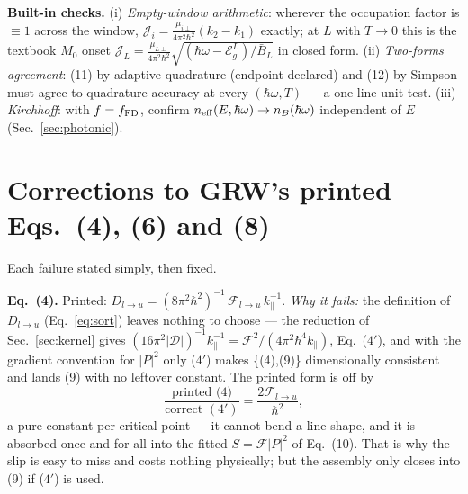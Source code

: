 \documentclass[11pt,a4paper]{article}
\numberwithin{equation}{section}
\newcommand{\hw}{\hbar\omega}
\newcommand{\EgL}{\mathcal{E}_g^{L}}
\newcommand{\cD}{\mathcal{D}}
\newcommand{\cF}{\mathcal{F}}
\newcommand{\cJ}{\mathcal{J}}
\newcommand{\Bb}{\bar{B}}
\newcommand{\kpar}{k_{\parallel}}
\newcommand{\Dlu}{D_{l\to u}}
\newcommand{\fFD}{f}
\begin{document}
\textbf{Built-in checks.}
(i) \emph{Empty-window arithmetic}: wherever the occupation factor is
$\equiv1$ across the window,
$\cJ_i=\frac{\mu_{i\perp}}{4\pi^2\hbar^2}(k_2-k_1)$ exactly; at $L$
with $T\to0$ this is the textbook $M_0$ onset
$\cJ_L=\frac{\mu_{L\perp}}{4\pi^2\hbar^2}
\sqrt{(\hw-\EgL)/\Bb_L}$ in closed form.
(ii) \emph{Two-forms agreement}: (11) by adaptive quadrature (endpoint
declared) and (12) by Simpson must agree to quadrature accuracy at
every $(\hw,T)$ --- a one-line unit test.
(iii) \emph{Kirchhoff}: with $\fFD=\fFD_{\rm FD}$, confirm
$n_{\rm eff}(E,\hw)\to n_B(\hw)$ independent of $E$
(Sec.~\ref{sec:photonic}).

\appendix
\section{Corrections to GRW's printed Eqs.\ (4), (6) and (8)}\label{app:grw}

Each failure stated simply, then fixed.

\medskip
\textbf{Eq.\ (4).}  Printed:
$\Dlu=(8\pi^2\hbar^2)^{-1}\,\cF_{l\to u}\,\kpar^{-1}$.
\emph{Why it fails:} the definition of $\Dlu$ (Eq.~\eqref{eq:sort})
leaves nothing to choose --- the reduction of
Sec.~\ref{sec:kernel} gives $(16\pi^2|\cD|)^{-1}\kpar^{-1}
=\cF^2/(4\pi^2\hbar^4\kpar)$, Eq.~($4'$), and with the gradient
convention for $|P|^2$ only ($4'$) makes \{(4),(9)\} dimensionally
consistent and lands (9) with no leftover constant.  The printed form
is off by
\begin{equation}
\frac{\text{printed (4)}}{\text{correct }(4')}=\frac{2\cF_{l\to u}}{\hbar^2},
\end{equation}
a pure constant per critical point --- it cannot bend a line shape,
and it is absorbed once and for all into the fitted $S=\cF|P|^2$ of
Eq.~(10).  That is why the slip is easy to miss and costs nothing
physically; but the assembly only closes into (9) if ($4'$) is used.
\end{document}
